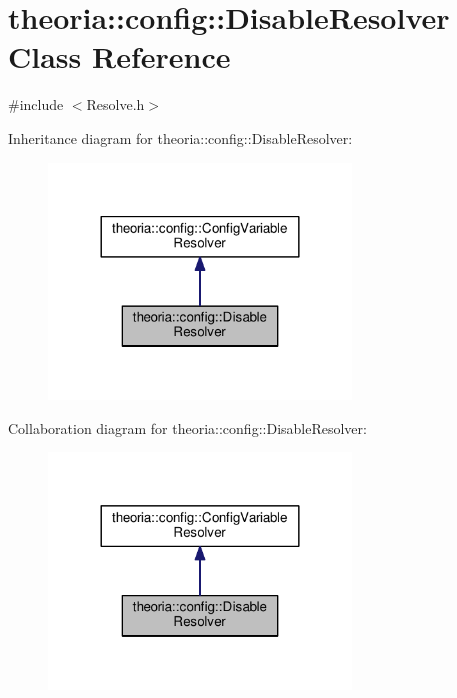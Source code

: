 \hypertarget{classtheoria_1_1config_1_1DisableResolver}{}\section{theoria\+:\+:config\+:\+:Disable\+Resolver Class Reference}
\label{classtheoria_1_1config_1_1DisableResolver}


{\ttfamily \#include $<$Resolve.\+h$>$}



Inheritance diagram for theoria\+:\+:config\+:\+:Disable\+Resolver\+:\nopagebreak
\begin{figure}[H]
\begin{center}
\leavevmode
\includegraphics[width=228pt]{classtheoria_1_1config_1_1DisableResolver__inherit__graph}
\end{center}
\end{figure}


Collaboration diagram for theoria\+:\+:config\+:\+:Disable\+Resolver\+:\nopagebreak
\begin{figure}[H]
\begin{center}
\leavevmode
\includegraphics[width=228pt]{classtheoria_1_1config_1_1DisableResolver__coll__graph}
\end{center}
\end{figure}
